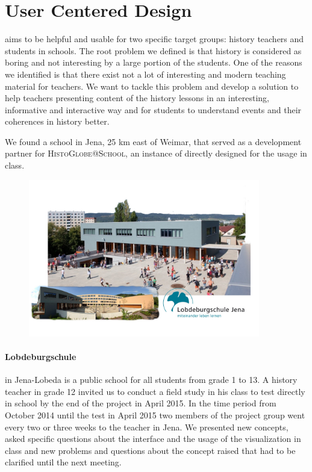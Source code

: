 \section{User Centered Design} %
\label{sec:user_centered_design}

\HG aims to be helpful and usable for two specific target groups: history teachers and students in schools. The root problem we defined is that history is considered as boring and not interesting by a large portion of the students. One of the reasons we identified is that there exist not a lot of interesting and modern teaching material for teachers. We want to tackle this problem and develop a solution to help teachers presenting content of the history lessons in an interesting, informative and interactive way and for students to understand events and their coherences in history better.

We found a school in Jena, 25 km east of Weimar, that served as a development partner for \textsc{HistoGlobe@School}, an instance of \HG directly designed for the usage in class.

\begin{figure}[H]
  \centering
  \includegraphics[width=0.9\textwidth]{graphics/lobdeburgschule.jpg}
\end{figure}

\paragraph{Lobdeburgschule} in Jena-Lobeda is a public school for all students from grade 1 to 13. A history teacher in grade 12 invited us to conduct a field study in his class to test \HG directly in school by the end of the project in April 2015. In the time period from October 2014 until the test in April 2015 two members of the project group went every two or three weeks to the teacher in Jena. We presented new concepts, asked specific questions about the interface and the usage of the visualization in class and new problems and questions about the concept raised that had to be clarified until the next meeting.

